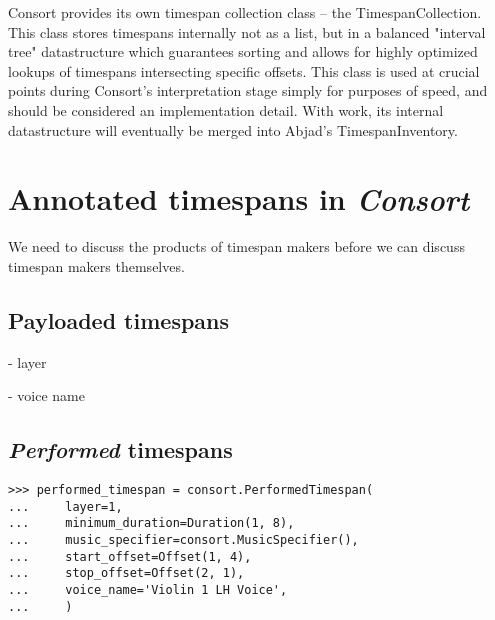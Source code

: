 Consort provides its own timespan collection class -- the TimespanCollection.
This class stores timespans internally not as a list, but in a balanced
"interval tree" datastructure which guarantees sorting and allows for highly
optimized lookups of timespans intersecting specific offsets. This class is
used at crucial points during Consort's interpretation stage simply for
purposes of speed, and should be considered an implementation detail. With
work, its internal datastructure will eventually be merged into Abjad's
TimespanInventory.

\section{Annotated timespans in \emph{Consort}}

We need to discuss the products of timespan makers before we can discuss
timespan makers themselves.

\subsection{Payloaded timespans}

- layer

- voice name

\subsection{\emph{Performed} timespans}

\begin{comment}
<abjad>
performed_timespan = consort.PerformedTimespan(
    layer=1,
    minimum_duration=Duration(1, 8),
    music_specifier=consort.MusicSpecifier(),
    start_offset=Offset(1, 4),
    stop_offset=Offset(2, 1),
    voice_name='Violin 1 LH Voice',
    )
</abjad>
\end{comment}

\begin{singlespacing}
\vspace{-0.5\baselineskip}
\begin{lstlisting}
>>> performed_timespan = consort.PerformedTimespan(
...     layer=1,
...     minimum_duration=Duration(1, 8),
...     music_specifier=consort.MusicSpecifier(),
...     start_offset=Offset(1, 4),
...     stop_offset=Offset(2, 1),
...     voice_name='Violin 1 LH Voice',
...     )
\end{lstlisting}
\end{singlespacing}

